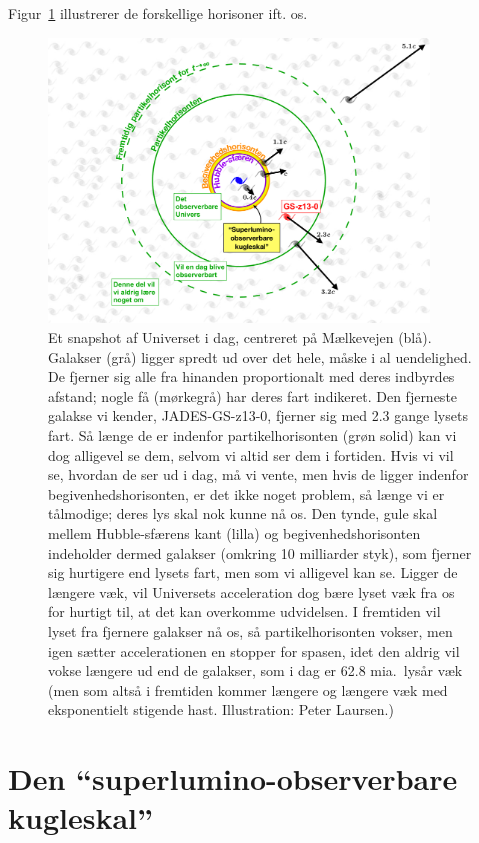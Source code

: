 \documentclass[useAMS,danish]{aa}
\begin{document}
Figur~\ref{fig:horizons} illustrerer de forskellige horisoner ift. os.
\begin{figure}[!t]
    \centering
    \includegraphics [width=0.90\textwidth] {./horizons.pdf}
    \caption{\small{
        Et snapshot af Universet i dag, centreret på Mælkevejen (blå).
        Galakser (grå) ligger spredt ud over det hele, måske i al uendelighed.
        De fjerner sig alle fra hinanden proportionalt med deres indbyrdes afstand; nogle få (mørkegrå) har deres fart indikeret.
        Den fjerneste galakse vi kender, JADES-GS-z13-0, fjerner sig med 2.3 gange lysets fart.
        Så længe de er indenfor partikelhorisonten (grøn solid) kan vi dog alligevel se dem, selvom vi altid ser dem i fortiden.
        Hvis vi vil se, hvordan de ser ud i dag, må vi vente, men hvis de ligger indenfor begivenhedshorisonten, er det ikke noget problem, så længe vi er tålmodige; deres lys skal nok kunne nå os.
        Den tynde, gule skal mellem Hubble-sfærens kant (lilla) og begivenhedshorisonten indeholder dermed galakser (omkring 10 milliarder styk), som fjerner sig hurtigere end lysets fart, men som vi alligevel kan se.
        Ligger de længere væk, vil Universets acceleration dog bære lyset væk fra os for hurtigt til, at det kan overkomme udvidelsen.
        I fremtiden vil lyset fra fjernere galakser nå os, så partikelhorisonten vokser, men igen sætter accelerationen en stopper for spasen, idet den aldrig vil vokse længere ud end de galakser, som i dag er 62.8 mia.~lysår væk (men som altså i fremtiden kommer længere og længere væk med eksponentielt stigende hast. Illustration: Peter Laursen.)
    }}
    \label{fig:horizons}
\end{figure}
\section{Den ``superlumino-observerbare kugleskal''}
\label{sec:obsskal}
\end{document}

